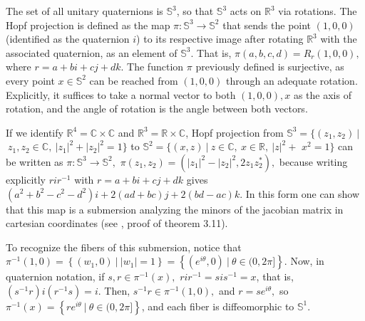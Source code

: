 \documentclass[12pt, letterpaper, reqno]{amsart}
\theoremstyle{definition}
\theoremstyle{plain}
\theoremstyle{remark}
\begin{document}
The set of all unitary quaternions is $ \mathbb{S}^3 $, so that $ \mathbb{S}^3 $ acts on $ \mathbb{R}^3 $ via rotations. The Hopf projection is defined as the map $ \pi: \mathbb{S}^3 \rightarrow \mathbb{S}^2 $ that sends the point $ (1,0,0) $ (identified as the quaternion $ i $)   to its respective image after rotating $ \mathbb{R}^3 $ with the associated quaternion, as an element of $ \mathbb{S}^3 $. That is, $ \pi(a,b,c,d) = R_r(1,0,0), $ where $ r=a+bi+cj+dk. $  The function $ \pi $ previously defined is surjective, as every point $ x\in\mathbb{S}^2 $ can be reached from $ (1,0,0) $ through an adequate rotation. Explicitly, it suffices to take a normal vector to both $ (1,0,0), x $ as the axis of rotation, and the angle of rotation is the angle between both vectors. 

	If we identify $ \mathbb{R}^4=\mathbb{C}\times \mathbb{C} $ and $ \mathbb{R}^3= \mathbb{R}\times\mathbb{C}  $, Hopf projection from $ \mathbb{S}^3= \{ (z_1,z_2)\  |$ $ \ z_1,z_2\in \mathbb{C}, \ |z_1|^2+|z_2|^2=1 \} $ to $ \mathbb{S}^2 = \{ (x,z)\ | \ z\in \mathbb{C},\ x\in \mathbb{R},\ |z|^2+$ $x^2=1 \} $  can be written as $ \pi: \mathbb{S}^3 \rightarrow { \mathbb{S}^2},$ $ \pi(z_1,z_2) =(|z_1|^2-|z_2|^2, 2z_1z_2^* ),$ because writing explicitly $ rir^{-1} $ with $ r=a+bi+cj+dk $ gives $ (a^2+b^2-c^2-d^2)i+2(ad+bc)j+2(bd-ac)k. $    In this form one can show that this map is a submersion analyzing the minors of the jacobian matrix in cartesian coordinates (see \cite{linintroductory}, proof of theorem 3.11).

	To recognize the fibers of this submersion, notice that $ \pi^{-1}(1,0) = \left\{ (w_1,0) \ | \ |w_1| =1 \right\} = \left\{ (e^{i\theta},0) \ | \ \theta\in (0,2\pi]  \right\} $. Now, in quaternion notation, if $ s,r\in \pi^{-1}(x), $ $ rir^{-1} = sis^{-1}=x $, that is, $ (s^{-1}r)i(r^{-1}s) = i $. Then, $ s^{-1}r \in \pi^{-1}(1,0), $ and $ r= se^{i\theta}, $ so $ \pi^{-1}(x) = \left\{ re^{i\theta}\ | \ \theta\in (0,2\pi] \right\} $, and each fiber is diffeomorphic to $ \mathbb{S}^1. $        
\end{document}
